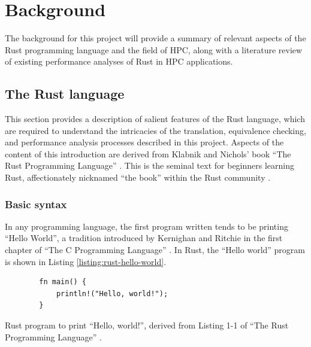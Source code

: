 \chapter{Background}
\label{ch:background}


The background for this project will provide a summary of relevant aspects of the Rust programming language and the field of \acrshort{HPC}, along with a literature review of existing performance analyses of Rust in \acrshort{HPC} applications.


\section{The Rust language}
\label{sec:rust}

This section provides a description of salient features of the Rust language, which are required to understand the intricacies of the translation, equivalence checking, and performance analysis processes described in this project. Aspects of the content of this introduction are derived from Klabnik and Nichols' book ``The Rust Programming Language'' \cite{RustProgrammingLanguage}. This is the seminal text for beginners learning Rust, affectionately nicknamed ``the book'' within the Rust community \cite{LearnRust}.

\subsection{Basic syntax}
\label{ssec:rust-syntax}

In any programming language, the first program written tends to be printing ``Hello World'', a tradition introduced by Kernighan and Ritchie in the first chapter of ``The C Programming Language'' \cite{kernighan2002c}. In Rust, the ``Hello world'' program is shown in Listing \ref{listing:rust-hello-world}.

\begin{listing}[H]
    \begin{verbatim}
        fn main() {
            println!("Hello, world!");
        }
    \end{verbatim}
    \caption{Rust program to print ``Hello, world!'', derived from Listing 1-1 of ``The Rust Programming Language'' \cite{RustProgrammingLanguage}.}
    \label{listing:rust-hello-world}
\end{listing}


